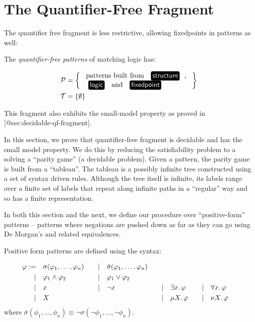 \hypertarget{sec:qf-fragment}{%
\section{The Quantifier-Free Fragment}\label{sec:qf-fragment}}

The quantifier free fragment is less restrictive, allowing fixedpoints in patterns as well:

\begin{definition}The \emph{quantifier-free patterns} of matching logic has:

\begin{align*}
\PP &= \left\{\begin{array}{l}\text{ patterns built from \structure{}, } \\
            \text{\logic{} and \fixedpoint{}}
              \end{array}\right\}\\
\TT &= \{\emptyset\}
\end{align*}\end{definition}

This fragment also exhibits the small-model property as proved in {[}@sec:decidable-qf-fragment{]}.

In this section, we prove that quantifier-free fragment is decidable and has
the small model property.
We do this by reducing the satisfiability problem to a solving a ``parity game'' (a decidable problem).
Given a pattern, the parity game is built from a ``tableau''.
The tableau is a possibly infinite tree constructed using a set of syntax driven rules.
Although the tree itself is infinite,
its labels range over a finite set of labels that repeat along infinite paths in a ``regular'' way
and so has a finite representation.

In both this section and the next,
we define our procedure over ``positive-form'' patterns
-- patterns where negations are pushed down as far as they can go using
De Morgan's and related equivalences.

\begin{definition}Positive form patterns are defined using the syntax:

\begin{alignat*}{5}
\phi := \quad&       \sigma(\phi_1, \ldots, \phi_n)
   &\quad\mid\quad&  \bar \sigma(\phi_1, \ldots, \phi_n) \\
    \quad\mid\quad&  \phi_1 \land \phi_2
   &\quad\mid\quad&  \phi_1 \lor  \phi_2 \\
    \quad\mid\quad&  x
   &\quad\mid\quad&  \lnot x
   &\quad\mid\quad&  \exists x \ldotp \phi
   &\quad\mid\quad&  \forall x \ldotp \phi \\
    \quad\mid\quad&  X &
                  &    &
    \quad\mid\quad&  \mu X \ldotp \phi
   &\quad\mid\quad&  \nu X \ldotp \phi
\end{alignat*}
where \(\bar \sigma(\phi_1, \ldots, \phi_n) \equiv \lnot\sigma(\lnot \phi_1, \ldots, \lnot\phi_n)\).\end{definition}

